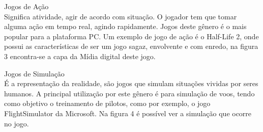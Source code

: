 \begin{alineascomponto}
\item Jogos de Ação\\
Significa atividade, agir de acordo com  situação. O jogador tem que tomar alguma ação em tempo real, agindo rapidamente. Jogos deste gênero é o mais popular para a plataforma PC. Um exemplo de jogo de ação é o Half-Life 2, onde possui as características de ser um jogo sagaz, envolvente e com enredo, na figura 3 encontra-se a capa da Mídia digital deste jogo. \cite{gen1}
\end{alineascomponto}
\begin{figure}[h!]
		\centering
	\end{figure}
\begin{alineascomponto}
\item Jogos de Simulação\\
É a representação da realidade, são jogos que simulam situações vividas por seres humanos. A principal utilização por este gênero é para simulação de voos, tendo como objetivo o treinamento de pilotos, como por exemplo, o jogo FlightSimulator da Microsoft. Na figura 4 é possível ver a simulação que ocorre no jogo. \cite{gen1}
\end{alineascomponto}
\begin{figure}[h!]
		\centering
	\end{figure}

